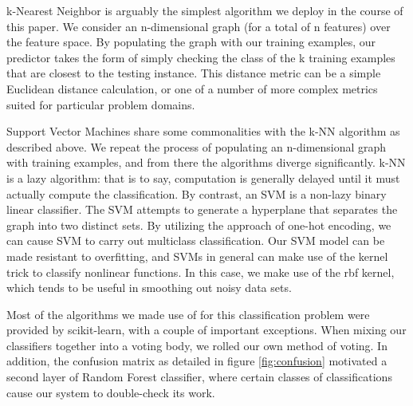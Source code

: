 k-Nearest Neighbor\cite{nearest} is arguably the simplest algorithm we 
deploy in the course of this paper.  We consider an n-dimensional 
graph (for a total of n features) over the feature space.  By populating 
the graph with our training examples, our predictor takes the form of 
simply checking the class of the k training examples that are closest 
to the testing instance.  This distance metric can be a simple 
Euclidean distance calculation, or one of a number of more complex 
metrics suited for particular problem domains.

Support Vector Machines\cite{support} share some commonalities with 
the k-NN algorithm as described above.  We repeat the process of 
populating an n-dimensional graph with training examples, and from 
there the algorithms diverge significantly.  k-NN is a lazy algorithm: 
that is to say, computation is generally delayed until it must actually 
compute the classification.  By contrast, an SVM is a non-lazy binary 
linear classifier.  The SVM attempts to generate a hyperplane that 
separates the graph into two distinct sets.  By utilizing the approach 
of one-hot encoding, we can cause SVM to carry out multiclass 
classification.  Our SVM model can be made resistant to overfitting, 
and SVMs in general can make use of the kernel trick to classify 
nonlinear functions.  In this case, we make use of the rbf\cite{rbf} 
kernel, which tends to be useful in smoothing out noisy data sets. 


Most of the algorithms we made use of for this classification problem 
were provided by scikit-learn, with a couple of important exceptions.  
When mixing our classifiers together into a voting body, we rolled our 
own method of voting.  In addition, the confusion matrix as detailed in 
figure \ref{fig:confusion} motivated a second layer of Random Forest 
classifier, where certain classes of classifications cause our system to 
double-check its work.  


